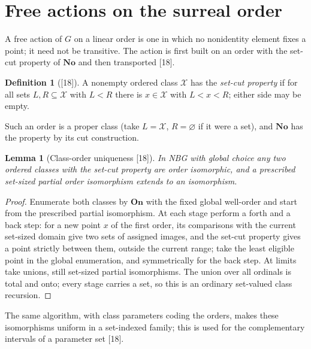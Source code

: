 \documentclass[11pt,oneside]{article}
\numberwithin{equation}{section}
\newtheorem{lemma}[lemma]{Lemma}
\theoremstyle{definition}
\newtheorem{definition}[definition]{Definition}
\theoremstyle{remark}
\newcommand{\No}{\mathbf{No}}
\newcommand{\src}[1]{\textup{\textsf{\small[#1]}}}
\newcommand{\On}{\mathbf{On}}
\begin{document}
\section{Free actions on the surreal order}\label{opa:es:sec:order}

A free action of $G$ on a linear order is one in which no nonidentity element fixes a point; it need not be transitive. The action
is first built on an order with the set-cut property of $\No$ and then transported \src{18}.

\begin{definition}[\src{18}]\label{opa:es:def:setcut}
A nonempty ordered class $\mathcal X$ has the \emph{set-cut property} if for all sets $L,R\subseteq\mathcal X$ with $L<R$ there is
$x\in\mathcal X$ with $L<x<R$; either side may be empty.
\end{definition}

Such an order is a proper class (take $L=\mathcal X$, $R=\varnothing$ if it were a set), and $\No$ has the property by its cut
construction.

\begin{lemma}[Class-order uniqueness \src{18}]\label{opa:es:lem:backforth}
In NBG with global choice any two ordered classes with the set-cut property are order isomorphic, and a prescribed set-sized partial
order isomorphism extends to an isomorphism.
\end{lemma}
\begin{proof}
Enumerate both classes by $\On$ with the fixed global well-order and start from the prescribed partial isomorphism. At each stage
perform a forth and a back step: for a new point $x$ of the first order, its comparisons with the current set-sized domain give two
sets of assigned images, and the set-cut property gives a point strictly between them, outside the current range; take the least
eligible point in the global enumeration, and symmetrically for the back step. At limits take unions, still set-sized partial
isomorphisms. The union over all ordinals is total and onto; every stage carries a set, so this is an ordinary set-valued class
recursion.
\end{proof}

The same algorithm, with class parameters coding the orders, makes these isomorphisms uniform in a set-indexed family; this is used
for the complementary intervals of a parameter set \src{18}.
\end{document}
